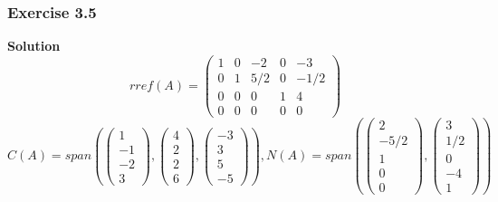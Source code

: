 \documentclass[aspectratio=169, UTF8]{ctexbeamer}
\begin{document}
\begin{frame}
    \frametitle{Exercise 3.5}
    \textbf{Solution}
    \begin{equation*}
        rref(A)=\begin{pmatrix}
            1&0&-2&0&-3\\
            0&1&5/2&0&-1/2\\
            0&0&0&1&4\\
            0&0&0&0&0
        \end{pmatrix}
    \end{equation*}
    \begin{equation*}
        C(A)=span(\begin{pmatrix}
            1\\-1\\-2\\3
        \end{pmatrix},\begin{pmatrix}
            4\\2\\2\\6
        \end{pmatrix},\begin{pmatrix}
            -3\\3\\5\\-5
        \end{pmatrix}), N(A)=span(\begin{pmatrix}
            2\\-5/2\\1\\0\\0
        \end{pmatrix},\begin{pmatrix}
            3\\1/2\\0\\-4\\1
        \end{pmatrix})
    \end{equation*}
\end{frame}
    
\end{document}
